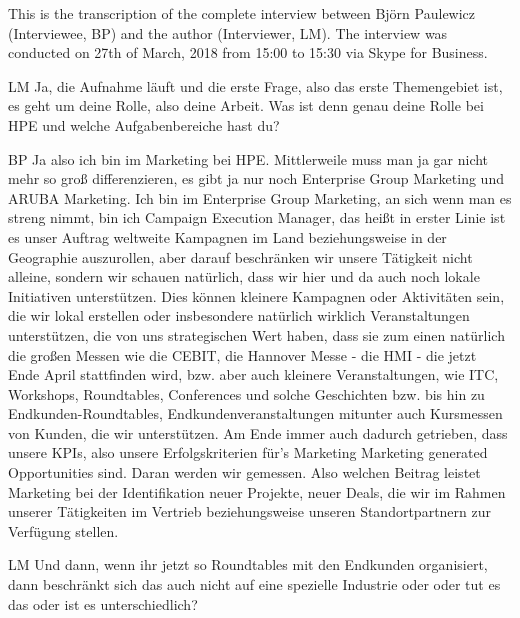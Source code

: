 \label{anhang:InterviewBP}
This is the transcription of the complete interview between Björn Paulewicz (Interviewee, BP) and the author (Interviewer, LM). The interview was conducted on 27th of March, 2018 from 15:00 to 15:30 via Skype for Business. 

\begin{xlist}
     \item[LM] Ja, die Aufnahme läuft und die erste Frage, also das erste Themengebiet ist, es geht um deine Rolle, also deine Arbeit. Was ist denn genau deine Rolle bei HPE und welche Aufgabenbereiche hast du? 
     \item[BP] Ja also ich bin im Marketing bei HPE. Mittlerweile muss man ja gar nicht mehr so groß differenzieren, es gibt ja nur noch Enterprise Group Marketing und ARUBA Marketing. Ich bin im Enterprise Group Marketing, an sich wenn man es streng nimmt, bin ich Campaign Execution Manager, das heißt in erster Linie ist es unser Auftrag weltweite Kampagnen im Land beziehungsweise in der Geographie auszurollen, aber darauf beschränken wir unsere Tätigkeit nicht alleine, sondern wir schauen natürlich, dass wir hier und da auch noch lokale Initiativen unterstützen. Dies können kleinere Kampagnen oder Aktivitäten sein, die wir lokal erstellen oder insbesondere natürlich wirklich Veranstaltungen unterstützen, die von uns strategischen Wert haben, dass sie zum einen natürlich die großen Messen wie die CEBIT, die Hannover Messe - die HMI - die jetzt Ende April stattfinden wird, bzw. aber auch kleinere Veranstaltungen, wie ITC, Workshops, Roundtables, Conferences und solche Geschichten bzw. bis hin zu Endkunden-Roundtables, Endkundenveranstaltungen mitunter auch Kursmessen von Kunden, die wir unterstützen. Am Ende immer auch dadurch getrieben, dass unsere KPIs, also unsere Erfolgskriterien für's Marketing Marketing generated Opportunities sind. Daran werden wir gemessen. Also welchen Beitrag leistet Marketing bei der Identifikation neuer Projekte, neuer Deals, die wir im Rahmen unserer Tätigkeiten im Vertrieb beziehungsweise unseren Standortpartnern zur Verfügung stellen.
     \item[LM] Und dann, wenn ihr jetzt so Roundtables mit den Endkunden organisiert, dann beschränkt sich das auch nicht auf eine spezielle Industrie oder oder tut es das oder ist es unterschiedlich?

\end{xlist}
